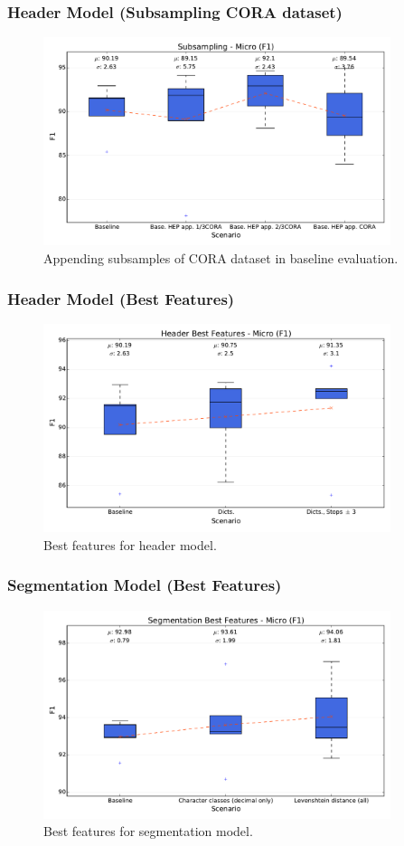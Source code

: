 \documentclass{beamer}
\begin{document}
\begin{frame}
\frametitle{Header Model (Subsampling CORA dataset)}
\begin{figure}[h]
\center
\includegraphics[width=4in]{Figures/micro_subsampling.pdf}
\caption{Appending subsamples of CORA dataset in baseline evaluation.}
\end{figure}
\end{frame}


\begin{frame}
\frametitle{Header Model (Best Features)}
\begin{figure}[h]
\center
\includegraphics[width=4in]{Figures/micro_header.pdf}
\caption{Best features for header model.}
\end{figure}
\end{frame}


\begin{frame}
\frametitle{Segmentation Model (Best Features)}
\begin{figure}[h]
\center
\includegraphics[width=4in]{Figures/micro_segmentation.pdf}
\caption{Best features for segmentation model.}
\end{figure}
\end{frame}
\end{document}
